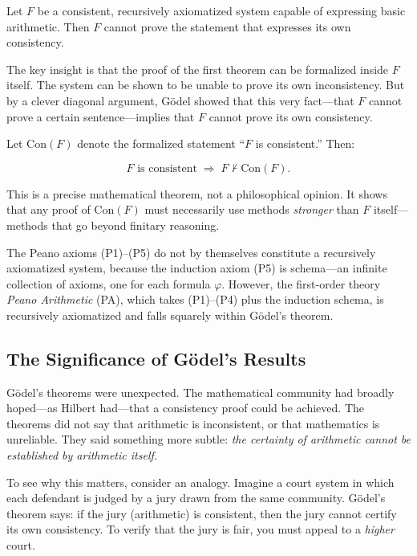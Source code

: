 \begin{theorem}
\label{thm:godel-second}
Let $F$ be a consistent, recursively axiomatized system capable of expressing basic arithmetic. Then $F$ cannot prove the statement that expresses its own consistency.
\end{theorem}

The key insight is that the proof of the first theorem can be formalized inside $F$ itself. The system can be shown to be unable to prove its own inconsistency. But by a clever diagonal argument, G\"odel showed that this very fact---that $F$ cannot prove a certain sentence---implies that $F$ cannot prove its own consistency.

Let $\mathrm{Con}(F)$ denote the formalized statement ``$F$ is consistent.'' Then:

\[
    F \text{ is consistent} \;\Longrightarrow\; F \nvdash \mathrm{Con}(F).
\]

This is a precise mathematical theorem, not a philosophical opinion. It shows that any proof of $\mathrm{Con}(F)$ must necessarily use methods \emph{stronger} than $F$ itself---methods that go beyond finitary reasoning.

\begin{remark}
The Peano axioms (P1)--(P5) do not by themselves constitute a recursively axiomatized system, because the induction axiom (P5) is schema---an infinite collection of axioms, one for each formula $\varphi$. However, the first-order theory \emph{Peano Arithmetic} (PA), which takes (P1)--(P4) plus the induction schema, is recursively axiomatized and falls squarely within G\"odel's theorem.
\end{remark}

\subsection{The Significance of G\"odel's Results}

G\"odel's theorems were unexpected. The mathematical community had broadly hoped---as Hilbert had---that a consistency proof could be achieved. The theorems did not say that arithmetic is inconsistent, or that mathematics is unreliable. They said something more subtle: \emph{the certainty of arithmetic cannot be established by arithmetic itself.}

To see why this matters, consider an analogy. Imagine a court system in which each defendant is judged by a jury drawn from the same community. G\"odel's theorem says: if the jury (arithmetic) is consistent, then the jury cannot certify its own consistency. To verify that the jury is fair, you must appeal to a \emph{higher} court.

